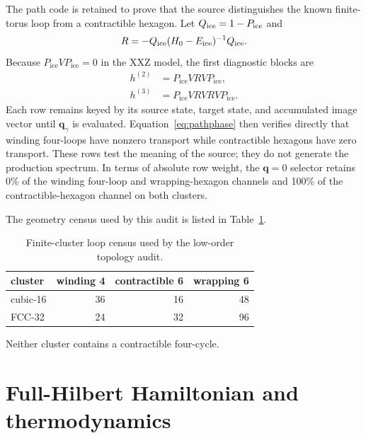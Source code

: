 \documentclass[11pt]{article}
\newcommand{\bq}{\bm q}
\newcommand{\Pice}{P_{\mathrm{ice}}}
\begin{document}
The path code is retained to prove that the source distinguishes the known
finite-torus loop from a contractible hexagon.  Let $Q_{\rm ice}=1-\Pice$ and
\begin{equation}
 R=-Q_{\rm ice}(H_0-E_{\rm ice})^{-1}Q_{\rm ice}.
\end{equation}
Because $\Pice V\Pice=0$ in the XXZ model, the first diagnostic blocks are
\begin{align}
 h^{(2)}&=\Pice VRV\Pice,\\
 h^{(3)}&=\Pice VRVRV\Pice.
 \label{eq:order23}
\end{align}
Each row remains keyed by its source state, target state, and accumulated
image vector until $\bq_\gamma$ is evaluated.  Equation~\eqref{eq:pathphase}
then verifies directly that winding four-loops have nonzero transport while
contractible hexagons have zero transport.  These rows test the meaning of the
source; they do not generate the production spectrum.  In terms of absolute
row weight, the $\bq=0$ selector retains 0\% of the winding four-loop and
wrapping-hexagon channels and 100\% of the contractible-hexagon channel on
both clusters.

The geometry census used by this audit is listed in
Table~\ref{tab:note_geometry_census}.
\begin{table}[htbp]
\caption{Finite-cluster loop census used by the low-order topology audit.}
\label{tab:note_geometry_census}
\centering
\begin{tabular}{lrrr}
\toprule
cluster & winding 4 & contractible 6 & wrapping 6\\
\midrule
cubic-16 & 36 & 16 & 48\\
FCC-32 & 24 & 32 & 96\\
\bottomrule
\end{tabular}
\end{table}
Neither cluster contains a contractible four-cycle.

\section{Full-Hilbert Hamiltonian and thermodynamics}
\end{document}
